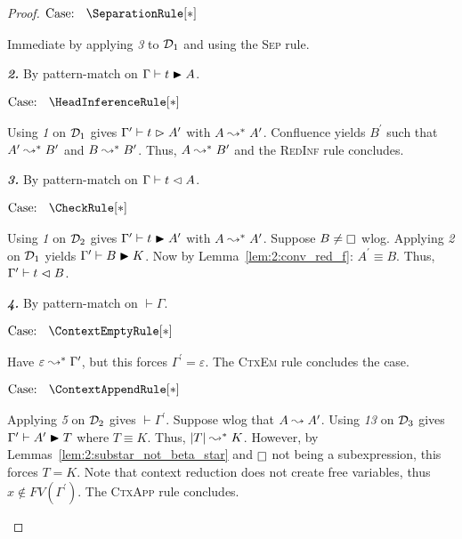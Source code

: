 \begin{proof}
    $\text{Case: }\begin{array}{c} \SeparationRule[*] \end{array}$
    \begin{proofcase}
        Immediate by applying \textit{3} to $\mathcal{D}_{1}$ and using the \textsc{Sep} rule.
    \end{proofcase}

    \textbf{\textit{2.}} By pattern-match on $\Gamma \vdash t \blacktriangleright A$.

    $\text{Case: }\begin{array}{c} \HeadInferenceRule[*] \end{array}$
    \begin{proofcase}
        Using \textit{1} on $\mathcal{D}_{1}$ gives $\Gamma^\prime \vdash t \vartriangleright A^\prime$ with $A \leadsto^* A^\prime$.
        Confluence yields $B^\prime$ such that $A^\prime \leadsto^* B^\prime$ and $B \leadsto^* B^\prime$.
        Thus, $A \leadsto^* B^\prime$ and the \textsc{RedInf} rule concludes.
    \end{proofcase}

    \textbf{\textit{3.}} By pattern-match on $\Gamma \vdash t \vartriangleleft A$.

    $\text{Case: }\begin{array}{c} \CheckRule[*] \end{array}$
    \begin{proofcase}
        Using \textit{1} on $\mathcal{D}_{2}$ gives $\Gamma^\prime \vdash t \blacktriangleright A^\prime$ with $A \leadsto^* A^\prime$.
        Suppose $B \neq \kind$ wlog.
        Applying \textit{2} on $\mathcal{D}_{1}$ yields $\Gamma^\prime \vdash B \blacktriangleright K$.
        Now by Lemma~\ref{lem:2:conv_red_f}: $A^\prime \equiv B$.
        Thus, $\Gamma^\prime \vdash t \vartriangleleft B$.
    \end{proofcase}

    \textbf{\textit{4.}} By pattern-match on $\vdash \Gamma$.

    $\text{Case: }\begin{array}{c} \ContextEmptyRule[*] \end{array}$
    \begin{proofcase}
        Have $\varepsilon \leadsto^* \Gamma^\prime$, but this forces $\Gamma^\prime = \varepsilon$.
        The \textsc{CtxEm} rule concludes the case.
    \end{proofcase}

    $\text{Case: }\begin{array}{c} \ContextAppendRule[*] \end{array}$
    \begin{proofcase}
        Applying \textit{5} on $\mathcal{D}_{2}$ gives $\vdash \Gamma^\prime$.
        Suppose wlog that $A \leadsto A^\prime$.
        Using \textit{13} on $\mathcal{D}_{3}$ gives $\Gamma^\prime \vdash A^\prime \blacktriangleright T$ where $T \equiv K$.
        Thus, $|T| \leadsto^* K$.
        However, by Lemmas~\ref{lem:2:substar_not_beta_star} and $\kind$ not being a subexpression, this forces $T = K$.
        Note that context reduction does not create free variables, thus $x \notin FV(\Gamma^\prime)$.
        The \textsc{CtxApp} rule concludes.
    \end{proofcase}


\end{proof}
